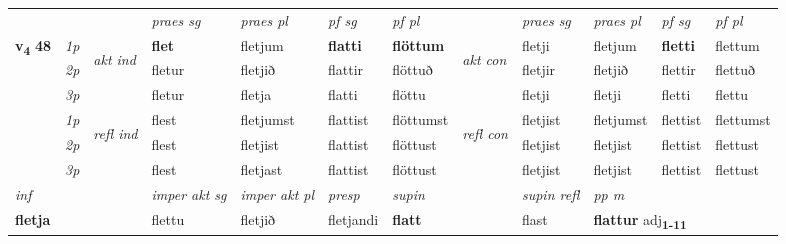 \begin{longtable}[l]{X>{\footnotesize\itshape}llXXXXlXXXX}
 & &   & \textit{praes sg}  & \textit{praes pl}    & \textit{ pf sg} & \textit{pf pl} & & \textit{praes sg}  & \textit{praes pl}    & \textit{pf sg} & \textit{pf pl }  \\ \cmidrule{4-7} \cmidrule{9-12}
 \multirow{2}{*}{{{\textbf{v{\textsubscript{4}}} \Large{\textbf{48}}}}}  & 1p & \multirow{3}{*}{\begin{turn}{90}\textit{akt ind}\end{turn}} & \textbf{flet} & fletjum & \textbf{flatti} & \textbf{flöttum} & \multirow{3}{*}{\begin{turn}{90}\textit{akt con}\end{turn}} &fletji & fletjum & \textbf{fletti} & flettum\\*
 & 2p &  &  fletur  & fletjið & flattir & flöttuð & & fletjir & fletjið & flettir & flettuð \\*
 & 3p &  & fletur & fletja & flatti & flöttu & & fletji & fletji& fletti & flettu \\*
\cmidrule{4-7} \cmidrule{9-12}
 & 1p & \multirow{3}{*}{\begin{turn}{90}\textit{refl ind}\end{turn}}  & flest & fletjumst & flattist & flöttumst & \multirow{3}{*}{\begin{turn}{90}\textit{refl con}\end{turn}}  &fletjist & fletjumst & flettist & flettumst \\*
 & 2p &  & flest & fletjist & flattist & flöttust & &fletjist & fletjist & flettist & flettust \\*
 & 3p  & & flest & fletjast & flattist & flöttust & & fletjist & fletjist& flettist & flettust \\*
\cmidrule{4-7} \cmidrule{9-12}

   {\textit{inf}} & &  & \textit{imper akt sg} & \textit{imper akt pl}   & \textit{presp} & \textit{supin} && \textit{supin refl} & \textit{pp m} \\*
  {\textbf{fletja}} & && flettu  & fletjið   & fletjandi &  \textbf{flatt} && flast & \multicolumn{2}{l}{\textbf{flattur} adj\textbf{\textsubscript{1-11}}} \\*

\midrule


\end{longtable}

